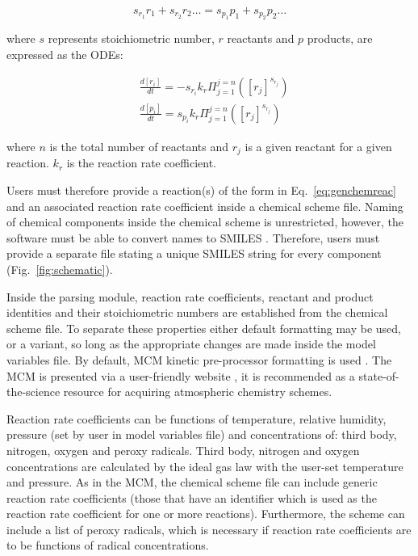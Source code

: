 \documentclass[gmd, manuscript]{copernicus}
\begin{document}
\begin{equation} \label{eq:genchemreac}
s_{r_{1}}r_{1}+s_{r_{2}}r_{2} \ldots=s_{p_{1}}p_{1}+s_{p_{2}}p_{2}\ldots
\end{equation}

where $s$ represents stoichiometric number, $r$ reactants and $p$ products, are expressed as the ODEs:

\begin{align} \label{eq:genchemode}
	&\frac{d[r_{i}]}{dt} = -s_{r_{i}}k_r\Pi_{j=1}^{j=n}\left([r_j]^{s_{r_{j}}}\right)\\
	&\frac{d[p_{i}]}{dt} = s_{p_{i}}k_r\Pi_{j=1}^{j=n}\left([r_j]^{s_{r_{j}}}\right) 
\end{align}

where $n$ is the total number of reactants and $r_{j}$ is a given reactant for a given reaction.  $k_r$ is the reaction rate coefficient.

Users must therefore provide a reaction(s) of the form in Eq.~\ref{eq:genchemreac} and an associated reaction rate coefficient inside a chemical scheme file.  Naming of chemical components inside the chemical scheme is unrestricted, however, the software must be able to convert names to SMILES \citep{Weininger1988}.  Therefore, users must provide a separate file stating a unique SMILES string for every component (Fig.~\ref{fig:schematic}).

Inside the parsing module, reaction rate coefficients, reactant and product identities and their stoichiometric numbers are established from the chemical scheme file.  To separate these properties either default formatting may be used, or a variant, so long as the appropriate changes are made inside the model variables file.  By default, MCM kinetic pre-processor formatting is used \citep{Jenkin1997, Saunders2003}.  The MCM is presented via a user-friendly website \citep{MCM2020}, it is recommended as a state-of-the-science resource for acquiring atmospheric chemistry schemes.

Reaction rate coefficients can be functions of temperature, relative humidity, pressure (set by user in model variables file) and concentrations of: third body, nitrogen, oxygen and peroxy radicals.  Third body, nitrogen and oxygen concentrations are calculated by the ideal gas law with the user-set temperature and pressure.  As in the MCM, the chemical scheme file can include generic reaction rate coefficients (those that have an identifier which is used as the reaction rate coefficient for one or more reactions).  Furthermore, the scheme can include a list of peroxy radicals, which is necessary if reaction rate coefficients are to be functions of radical concentrations.
\end{document}
